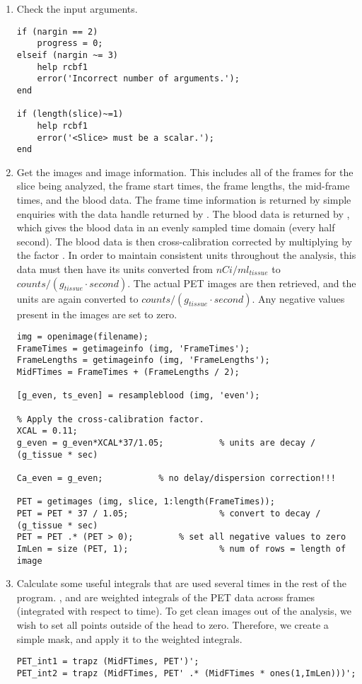\begin{enumerate}
\item Check the input arguments.
\begin{verbatim}
if (nargin == 2)
    progress = 0;
elseif (nargin ~= 3)
    help rcbf1
    error('Incorrect number of arguments.');
end

if (length(slice)~=1)
    help rcbf1
    error('<Slice> must be a scalar.');
end
\end{verbatim}

\item Get the images and image information.  This includes all of the
frames for the slice being analyzed, the frame start times, the frame
lengths, the mid-frame times, and the blood data.  The frame time
information is returned by simple enquiries with the data handle
 returned by .  The blood data is returned
by , which gives the blood data in an evenly
sampled time domain (every half second).  The blood data is then
cross-calibration corrected by multiplying by the factor .
In order to maintain consistent units throughout the analysis, this
data must then have its units converted from $nCi/ml_{tissue}$ to
$counts/(g_{tissue} \cdot second)$.  The actual PET images are then
retrieved, and the units are again converted to $counts/(g_{tissue}
\cdot second)$.  Any negative values present in the images are set to
zero.
\begin{verbatim}
img = openimage(filename);
FrameTimes = getimageinfo (img, 'FrameTimes');
FrameLengths = getimageinfo (img, 'FrameLengths');
MidFTimes = FrameTimes + (FrameLengths / 2);

[g_even, ts_even] = resampleblood (img, 'even');

% Apply the cross-calibration factor.
XCAL = 0.11;
g_even = g_even*XCAL*37/1.05;           % units are decay / (g_tissue * sec)

Ca_even = g_even; 			% no delay/dispersion correction!!!

PET = getimages (img, slice, 1:length(FrameTimes));
PET = PET * 37 / 1.05;                  % convert to decay / (g_tissue * sec)
PET = PET .* (PET > 0);			% set all negative values to zero
ImLen = size (PET, 1);                  % num of rows = length of image
\end{verbatim}

\item Calculate some useful integrals that are used several times in
the rest of the program.  , and  are
weighted integrals of the PET data across frames (integrated with
respect to time).  To get clean images out of the analysis, we wish to
set all points outside of the head to zero.  Therefore, we create a
simple mask, and apply it to the weighted integrals.
\begin{verbatim}
PET_int1 = trapz (MidFTimes, PET')';
PET_int2 = trapz (MidFTimes, PET' .* (MidFTimes * ones(1,ImLen)))';


\end{verbatim}
\end{enumerate}
